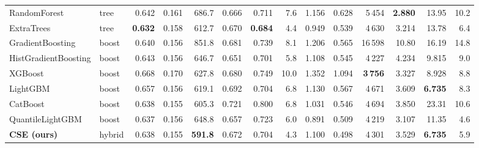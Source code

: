 \begin{tabular}{llrrrrrrrrrrrr}
RandomForest & tree & 0.642 & 0.161 & 686.7 & 0.666 & 0.711 & 7.6 & 1.156 & 0.628 & 5\,454 & \textbf{2.880} & 13.95 & 10.2 \\
ExtraTrees & tree & \textbf{0.632} & 0.158 & 612.7 & 0.670 & \textbf{0.684} & 4.4 & 0.949 & 0.539 & 4\,630 & 3.214 & 13.78 & 6.4 \\
GradientBoosting & boost & 0.640 & 0.156 & 851.8 & 0.681 & 0.739 & 8.1 & 1.206 & 0.565 & 16\,598 & 10.80 & 16.19 & 14.8 \\
HistGradientBoosting & boost & 0.643 & 0.156 & 646.7 & 0.651 & 0.701 & 5.8 & 1.108 & 0.545 & 4\,227 & 4.234 & 9.815 & 9.0 \\
XGBoost & boost & 0.668 & 0.170 & 627.8 & 0.680 & 0.749 & 10.0 & 1.352 & 1.094 & \textbf{3\,756} & 3.327 & 8.928 & 8.8 \\
LightGBM & boost & 0.657 & 0.156 & 619.1 & 0.692 & 0.704 & 6.8 & 1.130 & 0.567 & 4\,671 & 3.609 & \textbf{6.735} & 8.3 \\
CatBoost & boost & 0.638 & 0.155 & 605.3 & 0.721 & 0.800 & 6.8 & 1.031 & 0.546 & 4\,694 & 3.850 & 23.31 & 10.6 \\
QuantileLightGBM & boost & 0.637 & 0.156 & 648.8 & 0.657 & 0.723 & 6.0 & 0.891 & 0.509 & 4\,219 & 3.107 & 11.35 & 4.6 \\
\textbf{CSE (ours)} & hybrid & 0.638 & 0.155 & \textbf{591.8} & 0.672 & 0.704 & 4.3 & 1.100 & 0.498 & 4\,301 & 3.529 & \textbf{6.735} & 5.9 \\
\bottomrule
\end{tabular}
